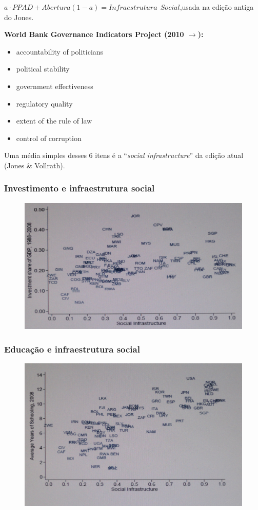 \documentclass[a4paper,12pt]{article}[abntex2]
\begin{document}
\(a\cdot PPAD + Abertura(1-a)=Infraestrutura \ \ Social\),usada na edição antiga do Jones.


\textbf{World Bank Governance Indicators Project (2010 $\rightarrow$):}

\begin{itemize}
    \item accountability of politicians
    \item political stability
    \item government effectiveness
    \item regulatory quality
    \item extent of the rule of law
    \item control of corruption
\end{itemize}

Uma média simples desses 6 itens é a “\textit{social infrastructure}” da edição atual (Jones \& Vollrath).


\subsubsection{\textbf{Investimento e infraestrutura social}}
\begin{figure}[H]
    \centering
    \includegraphics[width=0.7\linewidth]{Imagens/a16i2.png}
\end{figure}

\subsubsection{\textbf{Educação e infraestrutura social}}

\begin{figure}[H]
    \centering
    \includegraphics[width=0.7\linewidth]{Imagens/a16i3.png}
\end{figure}
\end{document}

